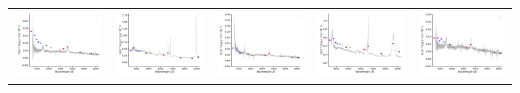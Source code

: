 \begin{center}
\begin{longtable}{l l l l l }
    \includegraphics[width=0.2\linewidth, clip]{Figs/Figs-sdss/spec-9406-58067-0121-STRIPE82-0007-021121.pdf} & \includegraphics[width=0.2\linewidth, clip]{Figs/Figs-sdss/spec-9406-58067-0648-STRIPE82-0006-027457.pdf} & \includegraphics[width=0.2\linewidth, clip]{Figs/Figs-sdss/spec-9406-58067-0764-STRIPE82-0008-036347.pdf} & \includegraphics[width=0.2\linewidth, clip]{Figs/Figs-sdss/spec-9407-58041-0415-STRIPE82-0004-031191.pdf} & \includegraphics[width=0.2\linewidth, clip]{Figs/Figs-sdss/spec-9409-58051-0225-STRIPE82-0015-053521.pdf} \\

\end{longtable}
\end{center}
